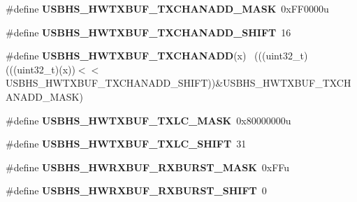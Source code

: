 \begin{DoxyCompactItemize}
\item 
\hypertarget{group___u_s_b_h_s___register___masks_gaa38734ee5ebe5c19de5e3a14ff378852}{}\#define {\bfseries U\+S\+B\+H\+S\+\_\+\+H\+W\+T\+X\+B\+U\+F\+\_\+\+T\+X\+C\+H\+A\+N\+A\+D\+D\+\_\+\+M\+A\+S\+K}~0x\+F\+F0000u\label{group___u_s_b_h_s___register___masks_gaa38734ee5ebe5c19de5e3a14ff378852}

\item 
\hypertarget{group___u_s_b_h_s___register___masks_gad12aaf01b73b5295568dbed9f4345306}{}\#define {\bfseries U\+S\+B\+H\+S\+\_\+\+H\+W\+T\+X\+B\+U\+F\+\_\+\+T\+X\+C\+H\+A\+N\+A\+D\+D\+\_\+\+S\+H\+I\+F\+T}~16\label{group___u_s_b_h_s___register___masks_gad12aaf01b73b5295568dbed9f4345306}

\item 
\hypertarget{group___u_s_b_h_s___register___masks_gabb5b8c031eed87147990913a189ec7dc}{}\#define {\bfseries U\+S\+B\+H\+S\+\_\+\+H\+W\+T\+X\+B\+U\+F\+\_\+\+T\+X\+C\+H\+A\+N\+A\+D\+D}(x)                          ~(((uint32\+\_\+t)(((uint32\+\_\+t)(x))$<$$<$U\+S\+B\+H\+S\+\_\+\+H\+W\+T\+X\+B\+U\+F\+\_\+\+T\+X\+C\+H\+A\+N\+A\+D\+D\+\_\+\+S\+H\+I\+F\+T))\&U\+S\+B\+H\+S\+\_\+\+H\+W\+T\+X\+B\+U\+F\+\_\+\+T\+X\+C\+H\+A\+N\+A\+D\+D\+\_\+\+M\+A\+S\+K)\label{group___u_s_b_h_s___register___masks_gabb5b8c031eed87147990913a189ec7dc}

\item 
\hypertarget{group___u_s_b_h_s___register___masks_ga204316c6357e22e368b1ef3b27cb5f28}{}\#define {\bfseries U\+S\+B\+H\+S\+\_\+\+H\+W\+T\+X\+B\+U\+F\+\_\+\+T\+X\+L\+C\+\_\+\+M\+A\+S\+K}~0x80000000u\label{group___u_s_b_h_s___register___masks_ga204316c6357e22e368b1ef3b27cb5f28}

\item 
\hypertarget{group___u_s_b_h_s___register___masks_ga8c1c2ec1565554850b073e3fd1708228}{}\#define {\bfseries U\+S\+B\+H\+S\+\_\+\+H\+W\+T\+X\+B\+U\+F\+\_\+\+T\+X\+L\+C\+\_\+\+S\+H\+I\+F\+T}~31\label{group___u_s_b_h_s___register___masks_ga8c1c2ec1565554850b073e3fd1708228}

\item 
\hypertarget{group___u_s_b_h_s___register___masks_ga135fb0e7ce2b049610e0c9053012eed8}{}\#define {\bfseries U\+S\+B\+H\+S\+\_\+\+H\+W\+R\+X\+B\+U\+F\+\_\+\+R\+X\+B\+U\+R\+S\+T\+\_\+\+M\+A\+S\+K}~0x\+F\+Fu\label{group___u_s_b_h_s___register___masks_ga135fb0e7ce2b049610e0c9053012eed8}

\item 
\hypertarget{group___u_s_b_h_s___register___masks_ga82e02071b676aced47a427bee29ff7c2}{}\#define {\bfseries U\+S\+B\+H\+S\+\_\+\+H\+W\+R\+X\+B\+U\+F\+\_\+\+R\+X\+B\+U\+R\+S\+T\+\_\+\+S\+H\+I\+F\+T}~0\label{group___u_s_b_h_s___register___masks_ga82e02071b676aced47a427bee29ff7c2}


\end{DoxyCompactItemize}
